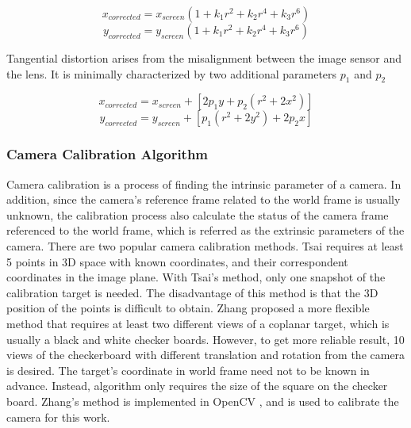 $$ x_{corrected} = x_{screen}(1+k_1r^2+k_2r^4+k_3r^6)$$
$$ y_{corrected} = y_{screen}(1+k_1r^2+k_2r^4+k_3r^6)$$

\noindent Tangential distortion arises from the misalignment between
the image sensor and the lens. It is minimally characterized by two
additional parameters $p_1$ and $p_2$ \cite{bradski_learning_2008}

$$x_{corrected} = x_{screen}+[2p_1y+p_2(r^2+2x^2)]$$
$$y_{corrected} = y_{screen}+[p_1(r^2+2y^2)+2p_2x]$$

\subsubsection{Camera Calibration Algorithm}
Camera calibration is a process of finding the intrinsic parameter of
a camera. In addition, since the camera's reference frame related to
the world frame is usually unknown, the calibration process also
calculate the status of the camera frame referenced to the world
frame, which is referred as the extrinsic parameters of the camera.
There are two popular camera calibration methods. Tsai
\cite{tsai_efficient_1986} requires at least 5 points in 3D space with
known coordinates, and their correspondent coordinates in the image
plane. With Tsai's method, only one snapshot of the calibration target
is needed. The disadvantage of this method is that the 3D position of
the points is difficult to obtain. Zhang \cite{zhang_flexible_2000}
proposed a more flexible method that requires at least two different
views of a coplanar target, which is usually a black and white checker
boards. However, to get more reliable result, 10 views of the
checkerboard with different translation and rotation from the camera
is desired. The target's coordinate in world frame need not to be
known in advance. Instead, algorithm only requires the size of the
square on the checker board. Zhang's method is implemented in OpenCV
\cite{bradski_learning_2008}, and is used to calibrate the camera for
this work.

